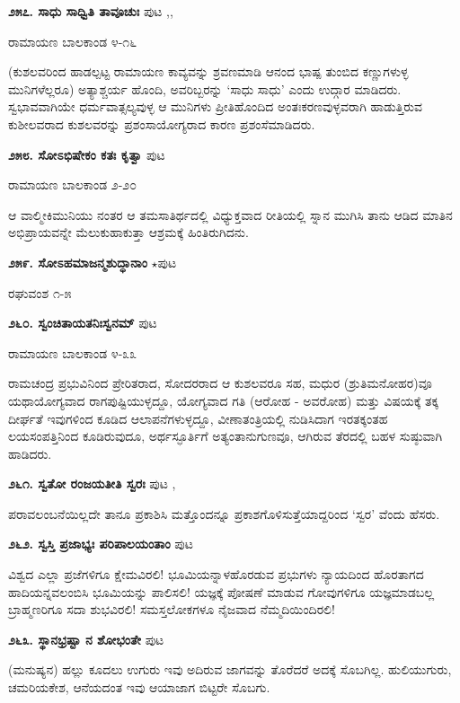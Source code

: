 \medskip
\noindent\textbf{೨೫೭. ಸಾಧು ಸಾಧ್ವಿತಿ ತಾವೂಚುಃ} \hfill ಪುಟ \pageref{168f},\pageref{211g},\pageref{242a}

\hfill ರಾಮಾಯಣ ಬಾಲಕಾಂಡ ೪-೧೬

(ಕುಶಲವರಿಂದ ಹಾಡಲ್ಪಟ್ಟ ರಾಮಾಯಣ ಕಾವ್ಯವನ್ನು ಶ್ರವಣಮಾಡಿ ಆನಂದ ಭಾಷ್ಪ ತುಂಬಿದ ಕಣ್ಣುಗಳುಳ್ಳ ಮುನಿಗಳೆಲ್ಲರೂ) ಅತ್ಯಾಶ್ಚರ್ಯ ಹೊಂದಿ, ಅವರಿಬ್ಬರನ್ನು `ಸಾಧು ಸಾಧು' ಎಂದು ಉದ್ಗಾರ ಮಾಡಿದರು. ಸ್ವಭಾವವಾಗಿಯೇ ಧರ್ಮವಾತ್ಸಲ್ಯವುಳ್ಳ ಆ ಮುನಿಗಳು ಪ್ರೀತಿಹೊಂದಿದ ಅಂತಃಕರಣವುಳ್ಳವರಾಗಿ ಹಾಡುತ್ತಿರುವ ಕುಶೀಲವರಾದ ಕುಶಲವರನ್ನು ಪ್ರಶಂಸಾಯೋಗ್ಯರಾದ ಕಾರಣ ಪ್ರಶಂಸೆಮಾಡಿದರು.

\medskip
\noindent\textbf{೨೫೮. ಸೋಽಭಿಷೇಕಂ ಕತಃ ಕೃತ್ವಾ} \hfill ಪುಟ \pageref{201c}

\hfill ರಾಮಾಯಣ ಬಾಲಕಾಂಡ ೨-೨೦

ಆ ವಾಲ್ಮೀಕಿಮುನಿಯು ನಂತರ ಆ ತಮಸಾತಿರ್ಥದಲ್ಲಿ ವಿಧ್ಯುಕ್ತವಾದ ರೀತಿಯಲ್ಲಿ ಸ್ನಾನ ಮುಗಿಸಿ ತಾನು ಆಡಿದ ಮಾತಿನ ಅಭಿಪ್ರಾಯವನ್ನೇ ಮೆಲುಕುಹಾಕುತ್ತಾ ಆಶ್ರಮಕ್ಕೆ ಹಿಂತಿರುಗಿದನು.

\medskip
\noindent\textbf{೨೫೯. ಸೋಽಹಮಾಜನ್ಮಶುದ್ಧಾನಾಂ} $\star$\hfill ಪುಟ \pageref{148b}

\hfill ರಘುವಂಶ ೧-೫

\medskip
\noindent\textbf{೨೬೦. ಸ್ವಂಚಿತಾಯತನಿಃಸ್ವನಮ್} \hfill ಪುಟ \pageref{250b}

\hfill ರಾಮಾಯಣ ಬಾಲಕಾಂಡ ೪-೩೩

ರಾಮಚಂದ್ರ ಪ್ರಭುವಿನಿಂದ ಪ್ರೇರಿತರಾದ, ಸೋದರರಾದ ಆ ಕುಶಲವರೂ ಸಹ, ಮಧುರ (ಶ್ರುತಿಮನೋಹರ)ವೂ ಯಥಾಯೋಗ್ಯವಾದ ರಾಗಪುಷ್ಟಿಯುಳ್ಳದ್ದೂ, ಯೋಗ್ಯವಾದ ಗತಿ (ಆರೋಹ - ಅವರೋಹ) ಮತ್ತು ವಿಷಯಕ್ಕೆ ತಕ್ಕ ದೀರ್ಘತೆ ಇವುಗಳಿಂದ ಕೂಡಿದ ಆಲಾಪನೆಗಳುಳ್ಳದ್ದೂ, ವೀಣಾತಂತ್ರಿಯಲ್ಲಿ ನುಡಿಸಿದಾಗ ಇರತಕ್ಕಂತಹ ಲಯಸಂಪತ್ತಿನಿಂದ ಕೂಡಿರುವುದೂ, ಅರ್ಥಸ್ಫೂರ್ತಿಗೆ ಅತ್ಯಂತಾನುಗುಣವೂ, ಆಗಿರುವ ತೆರದಲ್ಲಿ ಬಹಳ ಸುಷ್ಠುವಾಗಿ ಹಾಡಿದರು.

\medskip
\noindent\textbf{೨೬೧. ಸ್ವತೋ ರಂಜಯತೀತಿ ಸ್ವರಃ} \hfill ಪುಟ \pageref{11},\pageref{17a}

\hfill ಪರಾವಲಂಬನೆಯಿಲ್ಲದೇ ತಾನೂ ಪ್ರಕಾಶಿಸಿ ಮತ್ತೊಂದನ್ನೂ ಪ್ರಕಾಶಗೊಳಿಸುತ್ತೆಯಾದ್ದರಿಂದ `ಸ್ವರ' ವೆಂದು ಹೆಸರು.

\medskip
\noindent\textbf{೨೬೨. ಸ್ವಸ್ತಿ ಪ್ರಜಾಭ್ಯಃ ಪರಿಪಾಲಯಂತಾಂ} \hfill ಪುಟ \pageref{149b}

\hfill ವಿಶ್ವದ ಎಲ್ಲಾ ಪ್ರಜೆಗಳಿಗೂ ಕ್ಷೇಮವಿರಲಿ! ಭೂಮಿಯನ್ನಾಳಹೊರಡುವ ಪ್ರಭುಗಳು ನ್ಯಾಯದಿಂದ ಹೊರತಾಗದ ಹಾದಿಯನ್ನವಲಂಬಿಸಿ ಭೂಮಿಯನ್ನು ಪಾಲಿಸಲಿ! ಯಜ್ಞಕ್ಕೆ ಪೋಷಣೆ ಮಾಡುವ ಗೋವುಗಳಿಗೂ ಯಜ್ಞಮಾಡಬಲ್ಲ ಬ್ರಾಹ್ಮಣರಿಗೂ ಸದಾ ಶುಭವಿರಲಿ! ಸಮಸ್ತಲೋಕಗಳೂ ನೈಜವಾದ ನೆಮ್ಮದಿಯಿಂದಿರಲಿ!

\medskip
\noindent\textbf{೨೬೩. ಸ್ಥಾನಭ್ರಷ್ಟಾ ನ ಶೋಭಂತೇ} \hfill ಪುಟ \pageref{48d}

\hfill (ಮನುಷ್ಯನ) ಹಲ್ಲು ಕೂದಲು ಉಗುರು ಇವು ಅದಿರುವ ಜಾಗವನ್ನು ತೊರೆದರೆ ಅದಕ್ಕೆ ಸೊಬಗಿಲ್ಲ. ಹುಲಿಯುಗುರು, ಚಮರಿಯಕೇಶ, ಆನೆಯದಂತ ಇವು ಆಯಾಜಾಗ ಬಿಟ್ಟರೇ ಸೊಬಗು.

